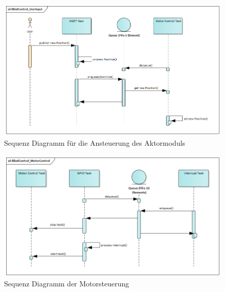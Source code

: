 \begin{figure}[hbt]
	\centering
	\includegraphics[width=1\linewidth]{images/Sequence_UserInput}
	\caption[Sequence UserInput]{Sequenz Diagramm für die Ansteuerung des Aktormoduls}
	\label{fig:Sequence_UserInput}
\end{figure}

\begin{figure}[hbt]
	\centering
	\includegraphics[width=1\linewidth]{images/Sequence_MotorControl}
	\caption[Sequence Diagramm MotorControl]{Sequenz Diagramm der Motorsteuerung}
	\label{fig:SequenceMotorControl}
\end{figure}

